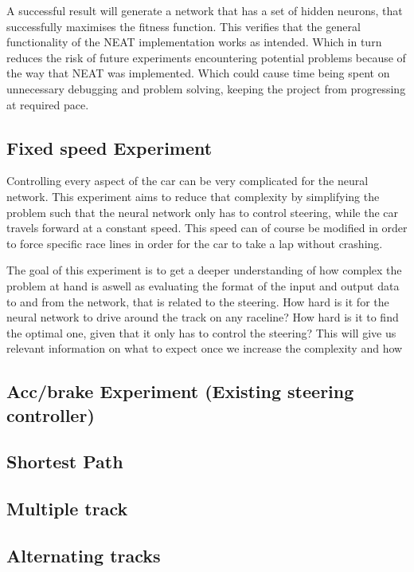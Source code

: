 A successful result will generate a network that has a set of hidden neurons, that successfully maximises the fitness function. This verifies that the general functionality of the NEAT implementation works as intended. Which in turn reduces the risk of future experiments encountering potential problems because of the way that NEAT was implemented. Which could cause time being spent on unnecessary debugging and problem solving, keeping the project from progressing at required pace.

\subsection{Fixed speed Experiment}
Controlling every aspect of the car can be very complicated for the neural network. This experiment aims to reduce that complexity by simplifying the problem such that the neural network only has to control steering, while the car travels forward at a constant speed. This speed can of course be modified in order to force specific race lines in order for the car to take a lap without crashing.

The goal of this experiment is to get a deeper understanding of how complex the problem at hand is aswell as evaluating the format of the input and output data to and from the network, that is related to the steering. How hard is it for the neural network to drive around the track on any raceline? How hard is it to find the optimal one, given that it only has to control the steering? This will give us relevant information on what to expect once we increase the complexity and how



\subsection{Acc/brake Experiment (Existing steering controller)}
\subsection{Shortest Path}
\subsection{Multiple track}
\subsection{Alternating tracks}


